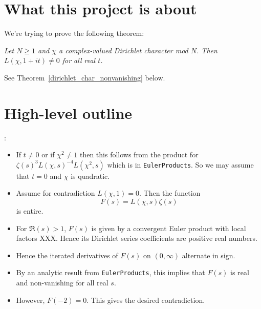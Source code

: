 %

\setcounter{section}{0}

\section{What this project is about}

We're trying to prove the following theorem:

\emph{Let $N \ge 1$ and $\chi$ a complex-valued Dirichlet character mod $N$. Then $L(\chi, 1 + it) \ne 0$ for all real $t$.}

See Theorem~\ref{dirichlet_char_nonvanishing} below.

\section{High-level outline}:

\begin{itemize}

\item If $t \ne 0$ or if $\chi^2 \ne 1$ then this follows from the product for $\zeta(s)^3 L(\chi, s)^{-4} L(\chi^2, s)$ which is in \texttt{EulerProducts}. So we may assume that $t = 0$ and $\chi$ is quadratic.

\item Assume for contradiction $L(\chi, 1) = 0$. Then the function
\[ F(s) = L(\chi, s) \zeta(s) \]
is entire.

\item For $\Re(s) > 1$, $F(s)$ is given by a convergent Euler product with local factors XXX. Hence its Dirichlet series coefficients are positive real numbers.

\item Hence the iterated derivatives of $F(s)$ on $(0, \infty)$ alternate in sign.

\item By an analytic result from \texttt{EulerProducts}, this implies that $F(s)$ is real and non-vanishing for all real $s$.


\item However, $F(-2) = 0$. This gives the desired contradiction.
\end{itemize}

